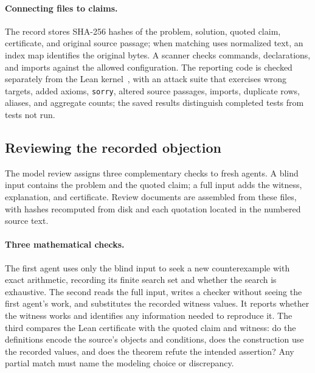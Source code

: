 \paragraph{Connecting files to claims.}
The record stores SHA-256 hashes of the problem, solution, quoted claim, certificate, and original source passage; when matching uses normalized text, an index map identifies the original bytes. A scanner checks commands, declarations, and imports against the allowed configuration. The reporting code is checked separately from the Lean kernel~\citep{wiedijk2012pollack}, with an attack suite that exercises wrong targets, added axioms, \texttt{sorry}, altered source passages, imports, duplicate rows, aliases, and aggregate counts; the saved results distinguish completed tests from tests not run.

\subsection{Reviewing the recorded objection}
\label{sec:method-revalidation}

The model review assigns three complementary checks to fresh agents. A blind input contains the problem and the quoted claim; a full input adds the witness, explanation, and certificate. Review documents are assembled from these files, with hashes recomputed from disk and each quotation located in the numbered source text.

\paragraph{Three mathematical checks.}
The first agent uses only the blind input to seek a new counterexample
with exact arithmetic, recording its finite search set and whether the
search is exhaustive. The second reads the full input, writes a checker
without seeing the first agent's work, and substitutes the recorded
witness values. It reports whether the witness works and identifies any
information needed to reproduce it. The third compares the Lean
certificate with the quoted claim and witness: do the definitions encode
the source's objects and conditions, does the construction use the
recorded values, and does the theorem refute the intended assertion?
Any partial match must name the modeling choice or discrepancy.

